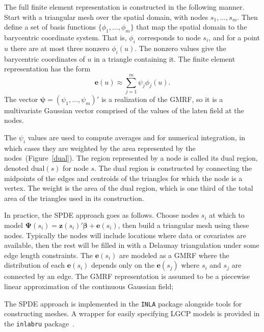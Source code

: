 \documentclass[]{interact}
\begin{document}
The full finite element representation is constructed in the following manner.
Start with a triangular mesh over the spatial domain, with nodes
\(s_{1}, \dots, s_{m}\). Then define a set of basis functions
\(\{\phi_{1}, \dots, \phi_{m}\}\) that map the spatial domain to the
barycentric coordinate system. That is, \(\phi_{i}\) corresponds to node
\(s_{i}\), and for a point \(u\) there are at most three nonzero
\(\phi_{i}(u)\). The nonzero values give the barycentric coordinates of \(u\)
in a triangle containing it. The finite element representation has the form
\begin{displaymath}
\mathbf{e}(u) \approx \sum_{j = 1}^{m} \psi_{j} \phi_{j}(u).
\end{displaymath}
The vector \(\boldsymbol{\psi} = (\psi_{1}, \dots, \psi_{m})'\) is a
realization of the GMRF, so it is a multivariate Gaussian vector comprised of
the values of the laten field at the nodes.

The \(\psi_{i}\) values are used to compute averages and for numerical
integration, in which cases they are weighted by the area represented by the
nodes~(Figure~\ref{dual}). The region represented by a node is called its dual
region, denoted \(\mathrm{dual}(s)\) for node \(s\). The dual region is
constructed by connecting the midpoints of the edges and centroids of the
triangles for which the node is a vertex. The weight is the area of the dual
region, which is one third of the total area of the triangles used in its
construction.

In practice, the SPDE approach goes as follows. Choose nodes \(s_{i}\)
at which to model \(\boldsymbol{\Psi}(s_{i})
= \mathbf{z}(s_{i})' \boldsymbol{\beta} + \mathbf{e}(s_{i})\), then build a
triangular mesh using these nodes. Typically the nodes will include locations
where data or covariates are available, then the rest will be filled in with a
Delaunay triangulation under some edge length constraints. The
\(\mathbf{e}(s_{i})\) are modeled as a GMRF where the distribution of
each \(\mathbf{e}(s_{i})\) depends only on the
\(\mathbf{e}(s_{j})\) where \(s_{i}\) and \(s_{j}\) are connected by an
edge. The GMRF representation is assumed to be a piecewise linear approximation
of the continuous Gaussian field;


The SPDE approach is implemented in the \texttt{INLA} package alongside tools
for constructing meshes. A wrapper for easily specifying LGCP models is
provided in the \texttt{inlabru} package~\cite{inlabru}.
\end{document}
